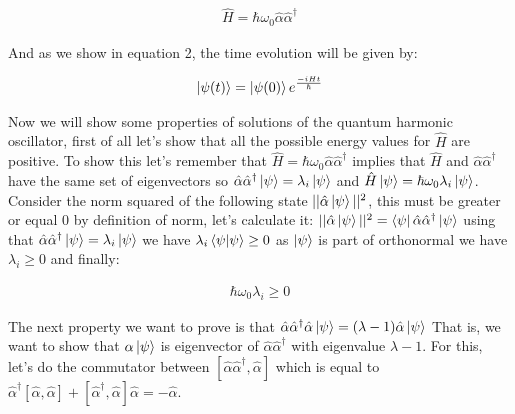 \documentclass[
  journal=largetwo,
  year=2023,
]{cup-journal}
\begin{document}
\begin{equation}
  \begin{aligned}\label{eq:11}
    \hat{H} = \hbar\omega_0\hat{\alpha}\hat{\alpha}^{\dag}
  \end{aligned}
\end{equation}

And as we show in equation 2, the time evolution will be given by:

\begin{equation}
  \begin{aligned}\label{eq:12}
    \ket{\psi(t)} = \ket{\psi(0)}e^{\frac{-iHt}{\hbar}}
  \end{aligned}
\end{equation}

Now we will show some properties of solutions of the quantum harmonic oscillator, first of all let's show that all the possible energy values for \(\hat{H}\) are positive. To show this let's remember that \(\hat{H} = \hbar\omega_0\hat{\alpha}\hat{\alpha}^{\dag}\) implies that \(\hat{H}\) and \(\hat{\alpha}\hat{\alpha}^{\dag}\) have the same set of eigenvectors so \(\hat{\alpha}\hat{\alpha}^{\dag}\ket{\psi} = \lambda_i\ket{\psi}\) and \(\hat{H}\ket{\psi} = \hbar\omega_0\lambda_i\ket{\psi}\). Consider the norm squared of the following state \(||\hat{\alpha}\ket{\psi}||^2\), this must be greater or equal 0 by definition of norm, let's calculate it: \(||\hat{\alpha}\ket{\psi}||^2 = \bra{\psi}\hat{\alpha}\hat{\alpha}^{\dag}\ket{\psi}\) using that \(\hat{\alpha}\hat{\alpha}^{\dag}\ket{\psi} = \lambda_i\ket{\psi}\) we have \(\lambda_i\bra{\psi}\ket{\psi} \geq 0\) as \(\ket{\psi}\) is part of orthonormal we have \(\lambda_i \geq 0\) and finally:

\begin{equation}
  \begin{aligned}\label{eq:13}
    \hbar\omega_0\lambda_i \geq 0
  \end{aligned}
\end{equation}

The next property we want to prove is that \(\hat{\alpha}\hat{\alpha}^{\dag}\hat{\alpha}\ket{\psi} = (\lambda-1)\hat{\alpha}\ket{\psi}\) That is, we want to show that \(\alpha\ket{\psi}\)  is eigenvector of \(\hat{\alpha}\hat{\alpha}^{\dag}\)  with eigenvalue \(\lambda-1\). For this, let's do the commutator between \([\hat{\alpha}\hat{\alpha}^{\dag}, \hat{\alpha}]\)  which is equal to \(\hat{\alpha}^{\dag}[\hat{\alpha}, \hat{\alpha}] + [\hat{\alpha}^{\dag}, \hat{\alpha}]\hat{\alpha} = -\hat{\alpha}\).
\end{document}
